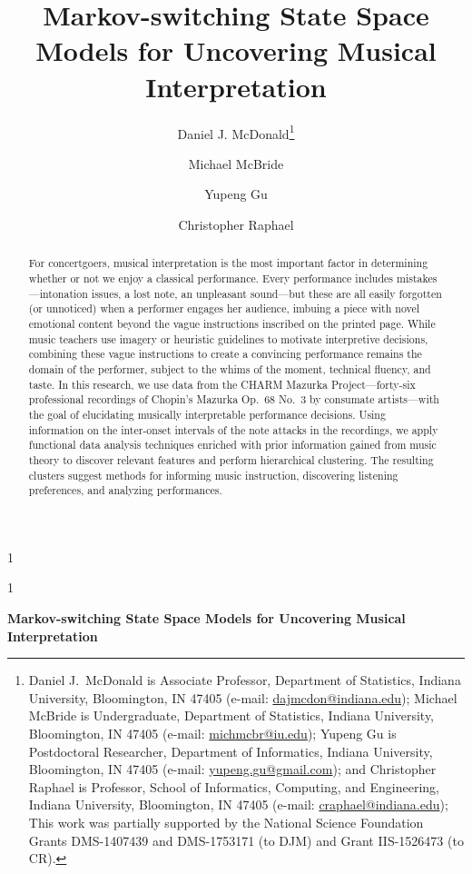 \documentclass[12pt]{article}
\newcommand{\blind}{1}
\newcommand{\email}[1]{\href{mailto:#1}{#1}}
\begin{document}
\blind
{
\title{Markov-switching State Space Models for Uncovering Musical Interpretation}
\author{Daniel J. McDonald\thanks{Daniel J.\ McDonald is Associate
    Professor, Department of Statistics, Indiana University,
    Bloomington, IN 47405 (e-mail: \email{dajmcdon@indiana.edu});
    Michael McBride is Undergraduate, Department of Statistics, Indiana University,
    Bloomington, IN 47405 (e-mail: \email{michmcbr@iu.edu});
    Yupeng Gu is Postdoctoral Researcher, Department of Informatics, Indiana University,
    Bloomington, IN 47405 (e-mail: \email{yupeng.gu@gmail.com});
    and Christopher Raphael is Professor, School of Informatics,
    Computing, and Engineering, Indiana University,
    Bloomington, IN 47405 (e-mail: \email{craphael@indiana.edu}); 
    This work was partially supported by 
    the National Science Foundation Grants DMS-1407439
    and DMS-1753171 (to DJM) and Grant IIS-1526473 (to CR).}
    \and
    Michael McBride
    \and
    Yupeng Gu
    \and
    Christopher Raphael
  }
\maketitle
} \fi

\blind
{
  \bigskip
  \bigskip
  \bigskip
  \begin{center}
    {\LARGE\bf Markov-switching State Space Models for Uncovering Musical Interpretation}
\end{center}
  \medskip
} \fi

\bigskip
\begin{abstract}
For concertgoers, musical interpretation is the most important factor
in determining whether or not we enjoy a classical performance. Every
performance includes mistakes---intonation issues, a lost note, an
unpleasant sound---but these are all easily forgotten (or unnoticed) when a performer
engages her audience, imbuing a piece with novel emotional content
beyond the vague instructions inscribed on the printed page. While music teachers use
imagery or heuristic guidelines to motivate interpretive decisions, combining these
vague instructions to create a convincing performance remains the domain
of the performer, subject to the whims of the moment, technical
fluency, and taste. In this
research, we use data from the CHARM Mazurka Project---forty-six professional
recordings of Chopin's Mazurka Op.\ 68 No.\ 3 by consumate artists---with the goal of
elucidating musically interpretable performance decisions. Using information on the
inter-onset intervals of the note attacks in the recordings, we apply functional data
analysis techniques enriched with prior information gained from music
theory to discover relevant features and perform hierarchical
clustering. The resulting clusters suggest methods for informing music
instruction, discovering listening preferences, and analyzing performances.

\end{abstract}
\end{document}
